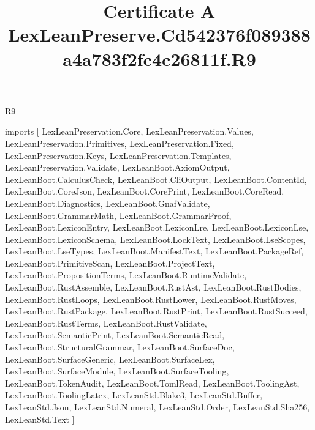 \begin{lexlean}{R9}
\title{Certificate A LexLeanPreserve.Cd542376f089388a4a783f2fc4c26811f.R9}
\begin{coremodule}
imports [
  LexLeanPreservation.Core,
  LexLeanPreservation.Values,
  LexLeanPreservation.Primitives,
  LexLeanPreservation.Fixed,
  LexLeanPreservation.Keys,
  LexLeanPreservation.Templates,
  LexLeanPreservation.Validate,
  LexLeanBoot.AxiomOutput,
  LexLeanBoot.CalculusCheck,
  LexLeanBoot.CliOutput,
  LexLeanBoot.ContentId,
  LexLeanBoot.CoreJson,
  LexLeanBoot.CorePrint,
  LexLeanBoot.CoreRead,
  LexLeanBoot.Diagnostics,
  LexLeanBoot.GnafValidate,
  LexLeanBoot.GrammarMath,
  LexLeanBoot.GrammarProof,
  LexLeanBoot.LexiconEntry,
  LexLeanBoot.LexiconLre,
  LexLeanBoot.LexiconLse,
  LexLeanBoot.LexiconSchema,
  LexLeanBoot.LockText,
  LexLeanBoot.LseScopes,
  LexLeanBoot.LseTypes,
  LexLeanBoot.ManifestText,
  LexLeanBoot.PackageRef,
  LexLeanBoot.PrimitiveScan,
  LexLeanBoot.ProjectText,
  LexLeanBoot.PropositionTerms,
  LexLeanBoot.RuntimeValidate,
  LexLeanBoot.RustAssemble,
  LexLeanBoot.RustAst,
  LexLeanBoot.RustBodies,
  LexLeanBoot.RustLoops,
  LexLeanBoot.RustLower,
  LexLeanBoot.RustMoves,
  LexLeanBoot.RustPackage,
  LexLeanBoot.RustPrint,
  LexLeanBoot.RustSucceed,
  LexLeanBoot.RustTerms,
  LexLeanBoot.RustValidate,
  LexLeanBoot.SemanticPrint,
  LexLeanBoot.SemanticRead,
  LexLeanBoot.StructuralGrammar,
  LexLeanBoot.SurfaceDoc,
  LexLeanBoot.SurfaceGeneric,
  LexLeanBoot.SurfaceLex,
  LexLeanBoot.SurfaceModule,
  LexLeanBoot.SurfaceTooling,
  LexLeanBoot.TokenAudit,
  LexLeanBoot.TomlRead,
  LexLeanBoot.ToolingAst,
  LexLeanBoot.ToolingLatex,
  LexLeanStd.Blake3,
  LexLeanStd.Buffer,
  LexLeanStd.Json,
  LexLeanStd.Numeral,
  LexLeanStd.Order,
  LexLeanStd.Sha256,
  LexLeanStd.Text
]


\end{coremodule}
\end{lexlean}
